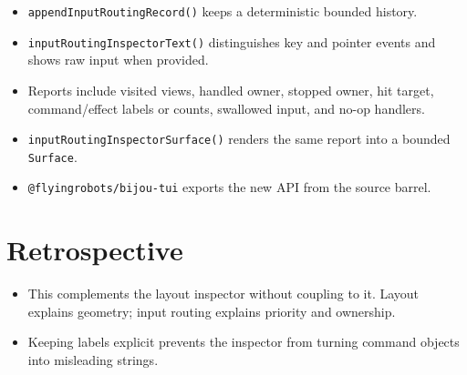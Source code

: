 \begin{itemize}
\tightlist
\item
  \texttt{a\allowbreak{}p\allowbreak{}p\allowbreak{}e\allowbreak{}n\allowbreak{}d\allowbreak{}I\allowbreak{}n\allowbreak{}p\allowbreak{}u\allowbreak{}t\allowbreak{}R\allowbreak{}o\allowbreak{}u\allowbreak{}t\allowbreak{}i\allowbreak{}n\allowbreak{}g\allowbreak{}R\allowbreak{}e\allowbreak{}c\allowbreak{}o\allowbreak{}r\allowbreak{}d\allowbreak{}(\allowbreak{})} keeps a deterministic bounded history.
\item
  \texttt{i\allowbreak{}n\allowbreak{}p\allowbreak{}u\allowbreak{}t\allowbreak{}R\allowbreak{}o\allowbreak{}u\allowbreak{}t\allowbreak{}i\allowbreak{}n\allowbreak{}g\allowbreak{}I\allowbreak{}n\allowbreak{}s\allowbreak{}p\allowbreak{}e\allowbreak{}c\allowbreak{}t\allowbreak{}o\allowbreak{}r\allowbreak{}T\allowbreak{}e\allowbreak{}x\allowbreak{}t\allowbreak{}(\allowbreak{})} distinguishes key and pointer events and shows raw input when provided.
\item
  Reports include visited views, handled owner, stopped owner, hit target, command/effect labels or counts, swallowed input, and no-op handlers.
\item
  \texttt{i\allowbreak{}n\allowbreak{}p\allowbreak{}u\allowbreak{}t\allowbreak{}R\allowbreak{}o\allowbreak{}u\allowbreak{}t\allowbreak{}i\allowbreak{}n\allowbreak{}g\allowbreak{}I\allowbreak{}n\allowbreak{}s\allowbreak{}p\allowbreak{}e\allowbreak{}c\allowbreak{}t\allowbreak{}o\allowbreak{}r\allowbreak{}S\allowbreak{}u\allowbreak{}r\allowbreak{}f\allowbreak{}a\allowbreak{}c\allowbreak{}e\allowbreak{}(\allowbreak{})} renders the same report into a bounded \texttt{S\allowbreak{}u\allowbreak{}r\allowbreak{}f\allowbreak{}a\allowbreak{}c\allowbreak{}e}.
\item
  \texttt{@\allowbreak{}f\allowbreak{}l\allowbreak{}y\allowbreak{}i\allowbreak{}n\allowbreak{}g\allowbreak{}r\allowbreak{}o\allowbreak{}b\allowbreak{}o\allowbreak{}t\allowbreak{}s\allowbreak{}/\allowbreak{}b\allowbreak{}i\allowbreak{}j\allowbreak{}o\allowbreak{}u\allowbreak{}-\allowbreak{}t\allowbreak{}u\allowbreak{}i} exports the new API from the source barrel.
\end{itemize}

\section{Retrospective}\label{record-123-retrospective}

\begin{itemize}
\tightlist
\item
  This complements the layout inspector without coupling to it. Layout explains geometry; input routing explains priority and ownership.
\item
  Keeping labels explicit prevents the inspector from turning command objects into misleading strings.
\end{itemize}

